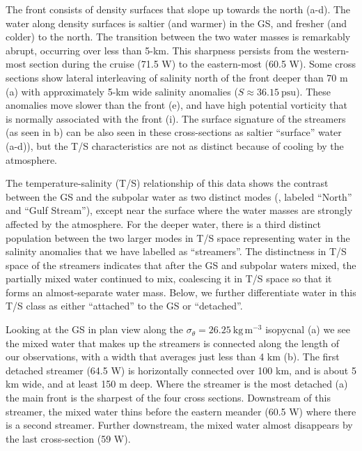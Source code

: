 \documentclass[draft,grl]{agutex2015}
\begin{document}
\begin{article}
The front consists of density surfaces that slope up towards the north (a-d).  The water along density surfaces is saltier (and warmer) in the GS, and fresher (and colder) to the north. The transition between the two water masses is remarkably abrupt, occurring over less than 5-km.  This sharpness persists from the western-most section during the cruise (71.5 W) to the eastern-most (60.5 W). Some cross sections show lateral interleaving of salinity north of the front deeper than 70 m (a) with approximately 5-km wide salinity anomalies ($S \approx 36.15\ \mathrm{psu}$).  These anomalies move slower than the front (e), and have high potential vorticity that is normally associated with the front (i).  The surface signature of the streamers (as seen in b) can be also seen in these cross-sections as saltier ``surface'' water (a-d)), but the T/S characteristics are not as distinct because of cooling by the atmosphere.  

The temperature-salinity (T/S) relationship of this data shows the contrast between the GS and the subpolar water as two distinct modes (, labeled ``North'' and ``Gulf Stream''), except near the surface where the water masses are strongly affected by the atmosphere.  For the deeper water, there is a third distinct population between the two larger modes in T/S space representing water in the salinity anomalies that we have labelled as ``streamers''.  The distinctness in T/S space of the streamers indicates that after the GS and subpolar waters mixed, the partially mixed water continued to mix, coalescing it in T/S space so that it forms an almost-separate water mass. Below, we further differentiate water in this T/S class as either ``attached'' to the GS or ``detached''.   

Looking at the GS in plan view along the $\sigma_{\theta} = 26.25\ \mathrm{kg\,m^{-3}}$ isopycnal (a) we see the mixed water that makes up the streamers is connected along the length of our observations, with a width that averages just less than 4 km (b). The first detached streamer (64.5 W) is horizontally connected over 100 km, and is about 5 km wide, and at least 150 m deep.  Where the streamer is the most detached (a) the main front is the sharpest of the four cross sections.    Downstream of this streamer, the mixed water thins before the eastern meander (60.5 W) where there is a second streamer.  Further downstream, the mixed water almost disappears by the last cross-section (59 W).


\end{article}
\end{document}
